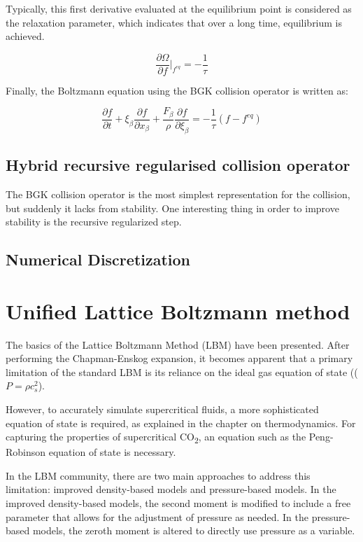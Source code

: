Typically, this first derivative evaluated at the equilibrium point is 
considered as the relaxation parameter, which indicates that over a 
long time, equilibrium is achieved.

\begin{equation}
	\frac{\partial \Omega}{\partial f} \bigg|_{f^{eq}} = -\frac{1}{\tau}	
\end{equation}

Finally, the Boltzmann equation using the BGK collision operator is written as:

\begin{equation}
	\frac{\partial f}{\partial t} 
	+ \xi_{\beta} \frac{\partial f}{\partial x_{\beta}}
	+ \frac{F_{\beta}}{\rho} \frac{\partial f}{\partial \xi_{\beta}} = -\frac{1}{\tau}(f - f^{eq})
\end{equation}


\subsection{Hybrid recursive regularised collision operator}
The BGK collision operator is the most simplest representation for the collision, but suddenly it lacks from stability. One interesting thing in order to improve stability is the recursive regularized step. 


\subsection{Numerical Discretization}

\section{Unified Lattice Boltzmann method}
The basics of the Lattice Boltzmann Method (LBM) have been presented. After performing the Chapman-Enskog expansion, it becomes apparent that a primary limitation of the standard LBM is its reliance on the ideal gas equation of state (($P$$=$$\rho$$c_s^2$).

However, to accurately simulate supercritical fluids, a more sophisticated equation of state is required, as explained in the chapter on thermodynamics. For capturing the properties of supercritical CO\textsubscript{2}, an equation such as the Peng-Robinson equation of state is necessary.

In the LBM community, there are two main approaches to address this limitation: improved density-based models and pressure-based models. In the improved density-based models, the second moment is modified to include a free parameter that allows for the adjustment of pressure as needed. In the pressure-based models, the zeroth moment is altered to directly use pressure as a variable.

